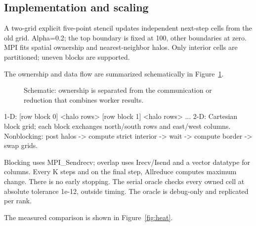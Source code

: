 \documentclass[11pt,a4paper]{article}
\begin{document}
\subsection{Implementation and scaling}

A two-grid explicit five-point stencil updates independent next-step cells from the old grid. Alpha=\allowbreak{}0.2; the top boundary is fixed at 100, other boundaries at zero. MPI fits spatial ownership and nearest-neighbor halos. Only interior cells are partitioned; uneven blocks are supported.


The ownership and data flow are summarized schematically in Figure~\ref{fig:flow1}.

\begin{figure}[htbp]\centering{}

\caption{Schematic: ownership is separated from the communication or reduction that combines worker results.}\label{fig:flow1}\end{figure}

1-D: [row block 0] <halo rows> [row block 1] <halo rows> ...\newline{} 2-D: Cartesian block grid; each block exchanges north/\allowbreak{}south rows and east/\allowbreak{}west columns. Nonblocking: post halos -> compute strict interior -> wait -> compute border -> swap grids.


Blocking uses MPI\_\allowbreak{}Sendrecv; overlap uses Irecv/\allowbreak{}Isend and a vector datatype for columns. Every K steps and on the final step, Allreduce computes maximum change. There is no early stopping. The serial oracle checks every owned cell at absolute tolerance 1e-12, outside timing. The oracle is debug-only and replicated per rank.


The measured comparison is shown in Figure~\ref{fig:heat}.
\end{document}
